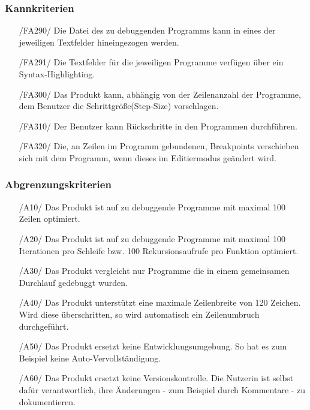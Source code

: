 \documentclass[parskip=full]{scrartcl}
\begin{document}
 		\subsubsection{Kannkriterien}
		\begin{itemize}
		\item[/FA290/] Die Datei des zu debuggenden Programms kann in eines der jeweiligen Textfelder hineingezogen werden.
		\item[/FA291/] Die Textfelder für die jeweiligen Programme verfügen über ein Syntax-Highlighting.
		\item[/FA300/] Das Produkt kann, abhängig von der Zeilenanzahl der Programme, dem Benutzer die Schrittgröße(Step-Size) vorschlagen.
		\item[/FA310/] Der Benutzer kann Rückschritte in den Programmen durchführen.
		\item[/FA320/] Die, an Zeilen im Programm gebundenen, \glspl{Breakpoint} verschieben sich mit dem Programm, wenn dieses im \gls{Editiermodus} geändert wird.
		\end{itemize}		 		
 		
 		
 		\subsubsection{Abgrenzungskriterien}
 		\begin{itemize}
 		\item[/A10/] Das Produkt ist auf zu debuggende Programme mit maximal 100 Zeilen optimiert.
 		\item[/A20/] Das Produkt ist auf zu debuggende Programme mit maximal 100 Iterationen pro Schleife bzw. 100 Rekursionsaufrufe pro Funktion optimiert.
 		\item[/A30/] Das Produkt vergleicht nur Programme die in einem gemeinsamen Durchlauf gedebuggt wurden.
 		\item[/A40/] Das Produkt unterstützt eine maximale Zeilenbreite von 120 Zeichen. Wird diese überschritten, so wird automatisch ein Zeilenumbruch durchgeführt.
 		\item[/A50/] Das Produkt ersetzt keine Entwicklungsumgebung. So hat es zum Beispiel keine Auto-Vervollständigung.
 		\item[/A60/] Das Produkt ersetzt keine Versionskontrolle. Die Nutzerin ist selbst dafür verantwortlich, ihre Änderungen - zum Beispiel durch Kommentare - zu dokumentieren.
 		\end{itemize}
 		
 \newpage		
 		
\end{document}
